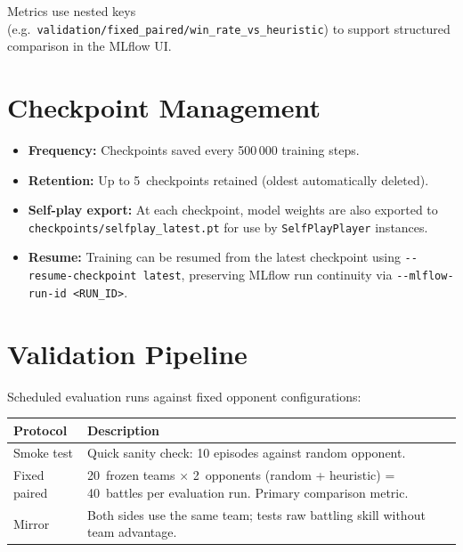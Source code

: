 Metrics use nested keys (e.g.\
\texttt{validation/fixed\_paired/win\_rate\_vs\_heuristic}) to support
structured comparison in the MLflow UI.


\section{Checkpoint Management}

\begin{itemize}
  \item \textbf{Frequency:} Checkpoints saved every 500\,000 training steps.
  \item \textbf{Retention:} Up to 5~checkpoints retained (oldest automatically
        deleted).
  \item \textbf{Self-play export:} At each checkpoint, model weights are also
        exported to \texttt{checkpoints/selfplay\_latest.pt} for use by
        \texttt{SelfPlayPlayer} instances.
  \item \textbf{Resume:} Training can be resumed from the latest checkpoint
        using \texttt{-{}-resume-checkpoint latest}, preserving MLflow run
        continuity via \texttt{-{}-mlflow-run-id <RUN\_ID>}.
\end{itemize}

\section{Validation Pipeline}

Scheduled evaluation runs against fixed opponent configurations:

\begin{center}
\small
\begin{tabularx}{\textwidth}{l X}
  \toprule
  \textbf{Protocol} & \textbf{Description} \\
  \midrule
  Smoke test     & Quick sanity check: 10 episodes against random opponent. \\
  Fixed paired   & 20~frozen teams $\times$ 2~opponents (random + heuristic) =
                   40~battles per evaluation run.  Primary comparison metric. \\
  Mirror         & Both sides use the same team; tests raw battling skill
                   without team advantage. \\
  \bottomrule
\end{tabularx}
\end{center}

